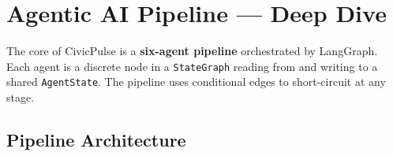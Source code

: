 \documentclass[11pt,a4paper]{article}
\newcommand{\tech}[1]{\texttt{\color{cpteal}#1}}
\begin{document}
\clearpage

\section{Agentic AI Pipeline — Deep Dive}
\label{sec:agents}

The core of CivicPulse is a \textbf{six-agent pipeline} orchestrated by LangGraph. Each agent is a discrete node in a \tech{StateGraph} reading from and writing to a shared \tech{AgentState}. The pipeline uses conditional edges to short-circuit at any stage.

\subsection{Pipeline Architecture}
\end{document}
